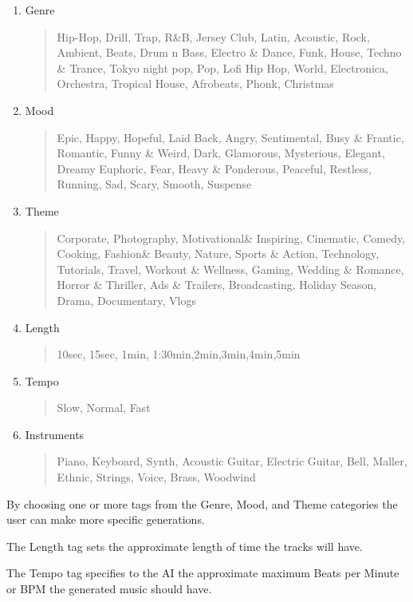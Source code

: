 \documentclass[a4paper,one side,12pt]{book}
\begin{document}
\begin{enumerate}
\def\labelenumi{\arabic{enumi}.}
\item
  Genre 
  \begin{quote}
      Hip-Hop, Drill, Trap, R\&B, Jersey Club, Latin, Acoustic, Rock, Ambient, Beats, Drum n Bass, Electro \& Dance, Funk, House, Techno \& Trance, Tokyo night pop, Pop, Lofi Hip Hop, World, Electronica, Orchestra, Tropical House, Afrobeats, Phonk, Christmas
  \end{quote}
\item 
    Mood 
    \begin{quote}
        Epic, Happy, Hopeful, Laid Back, Angry, Sentimental, Busy \& Frantic, Romantic, Funny \& Weird, Dark, Glamorous, Mysterious, Elegant, Dreamy Euphoric, Fear, Heavy \& Ponderous, Peaceful, Restless, Running, Sad, Scary, Smooth, Suspense 
    \end{quote}
\item
  Theme 
  \begin{quote}
      Corporate, Photography, Motivational\& Inspiring, Cinematic, Comedy, Cooking, Fashion\& Beauty, Nature, Sports \& Action, Technology, Tutorials, Travel, Workout \& Wellness, Gaming, Wedding \& Romance, Horror \& Thriller, Ads \& Trailers, Broadcasting, Holiday Season, Drama, Documentary, Vlogs
  \end{quote}
\item
  Length 
  \begin{quote}
      10sec, 15sec, 1min, 1:30min,2min,3min,4min,5min
  \end{quote}
\item
  Tempo 
  \begin{quote}
      Slow, Normal, Fast
  \end{quote}
\item Instruments 
    \begin{quote}
        Piano, Keyboard, Synth, Acoustic Guitar, Electric Guitar, Bell, Maller, Ethnic, Strings, Voice, Brass, Woodwind 
        \end{quote}
\end{enumerate}

By choosing one or more tags from the Genre, Mood, and Theme categories
the user can make more specific generations.

The Length tag sets the approximate length of time the tracks will have.

The Tempo tag specifies to the AI the approximate maximum Beats per
Minute or BPM the generated music should have.
\end{document}
